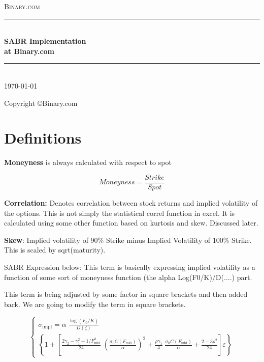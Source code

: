 \documentclass[a4paper, 12pt]{article}
\begin{document}
\frontmatter

\begin{titlepage}
\begin{center}
\textsc{\Large Binary.com}\\[0.5cm]
\newcommand{\HRule}{\rule{\linewidth}{0.5mm}}
\HRule \\[0.5cm]
{ \huge \bfseries SABR Implementation \\ at Binary.com}\\[0.5cm]
\HRule \\[1.5cm]

{\large \today}
\vfill

\tiny
Copyright \copyright Binary.com

\end{center}
\end{titlepage}


\section{Definitions}

\textbf{Moneyness} is always calculated with respect to spot

\begin{equation}
Moneyness = \frac{Strike}{Spot}
\end{equation}

\textbf{Correlation: }Denotes correlation between stock returns and implied volatility of the options. This is not simply the statistical correl function in excel. It is calculated using some other function based on kurtosis and skew. Discussed later. 

\textbf{Skew}: Implied volatility of 90\% Strike minus Implied Volatility of 100\% Strike. This is scaled by sqrt(maturity).

SABR Expression below: This term is basically expressing implied volatility as a function of some sort of moneyness function (the alpha Log(F0/K)/D(....) part. 

This term is being adjusted by some factor in square brackets and then added back. We are going to modify the term in square brackets. 

\begin{equation}
\begin{cases}
\sigma_{\text{impl}}=\alpha\;
\frac{\log\left(F_0/K\right)}{D\left(\zeta\right)}\; \\
\left\{1+\left[\frac{2\gamma_2-\gamma_1^2+1/F_{\text{mid}}^2}{24}\;\left(\frac{\sigma_0 C\left(F_{\text{mid}}\right)} {\alpha}\right)^2+ \frac{\rho\gamma_1}{4}\;\frac{\sigma_0 C\left(F_{\text{mid}}\right)}{\alpha}+\frac{2-3\rho^2}{24}
\right]\varepsilon\right\}
\end{cases}
\end{equation}
\end{document}
